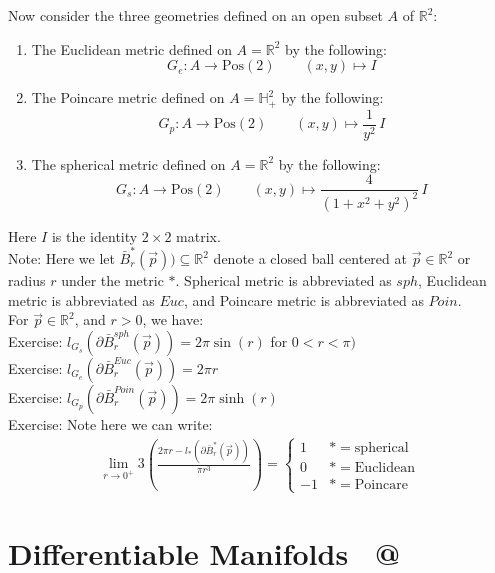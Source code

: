 \documentclass[15pt]{book}
\makeatletter
\theoremstyle{break}
\theoremstyle{break}
\newcommand{\R}{\mathbb{R}}
\newcommand{\note}{\color{red}Note: \color{black}}
\newcommand{\exercise}{\color{green}Exercise: \color{black}}
\newcommand*{\rom}[1]{\expandafter\@slowromancap\romannumeral #1@}
\makeatother
\begin{document}
\newpage
Now consider the three geometries defined on an open subset $A$ of $\R^2$:
\begin{enumerate}[topsep=3pt,itemsep=-1ex,partopsep=1ex,parsep=1ex]
\item The Euclidean metric defined on $A = \R^2$ by the following: 
	  $$G_e:A \to \text{Pos}(2) \qquad (x,y) \mapsto I$$ 
\item The Poincare metric defined on $A = \mathbb{H}_+^2$ by the following: 
	  $$G_p:A \to \text{Pos}(2) \qquad (x,y) \mapsto \frac{1}{y^2}\, I $$
\item The spherical metric defined on $A = \R^2$ by the following: 
	  $$G_s:A \to \text{Pos}(2) \qquad (x,y) \mapsto \frac{4}{(1+x^2 + y^2)^2}\, I$$ 
\end{enumerate}
Here $I$ is the identity $2\times 2$ matrix.\\

\note Here we let $\bar{B}_{r}^{*}(\vec{p})) \subseteq \R^2$ denote a closed ball centered at $\vec{p}\in \R^2$ or radius $r$ under the metric $*$. Spherical metric is abbreviated as $sph$, Euclidean metric is abbreviated as $Euc$, and Poincare metric is abbreviated as $Poin$.\\

For $\vec{p}\in \R^2$, and $r >0$, we have:\\
\exercise $l_{G_s}(\partial \bar{B}_{r}^{sph}(\vec{p})) = 2\pi \sin(r)$ for $0<r<\pi)$\\
\exercise $l_{G_e}(\partial \bar{B}_{r}^{Euc}(\vec{p})) = 2\pi r$\\
\exercise $l_{G_p}(\partial \bar{B}_{r}^{Poin}(\vec{p})) = 2\pi \sinh(r)$\\


\exercise Note here we can write:
\begin{align*}
\lim_{r\to 0^+} 3\left(\frac{2\pi r - l_{*}(\partial \bar{B}_r^{*}(\vec{p}))}{\pi r^3}\right) = \begin{cases} 
1 &  *=\text{spherical}\\
0 &  *=\text{Euclidean}\\
-1 & *=\text{Poincare}
\end{cases}
\end{align*}


\newpage
\chapter{Differentiable Manifolds \ \rom{3}}
\setcounter{section}{42}
\end{document}
